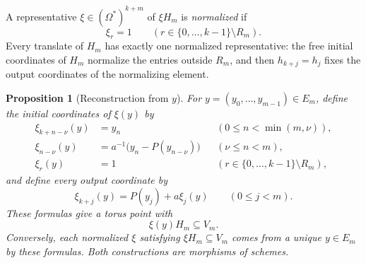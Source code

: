 \documentclass[11pt]{article}
\newcommand{\Om}{\Omega}
\newtheorem{proposition}[lemma]{Proposition}
\theoremstyle{remark}
\numberwithin{equation}{section}
\begin{document}
A representative \(\xi\in(\Om^\ast)^{k+m}\) of \(\xi H_m\) is \emph{normalized} if
\[
 \xi_r=1\qquad(r\in\{0,\ldots,k-1\}\setminus R_m).
\]
Every translate of \(H_m\) has exactly one normalized representative: the free initial coordinates of \(H_m\) normalize the entries outside \(R_m\), and then \(h_{k+j}=h_j\) fixes the output coordinates of the normalizing element.

\begin{proposition}[Reconstruction from \(y\)]\label{prop:reconstruction}
For \(y=(y_0,\ldots,y_{m-1})\in E_m\), define the initial coordinates of \(\xi(y)\) by
\begin{align}
 \xi_{k+n-\nu}(y)&=y_n
 &&(0\leq n<\min(m,\nu)), \label{eq:reconstruct-tail}\\
 \xi_{n-\nu}(y)&=a^{-1}\bigl(y_n-P(y_{n-\nu})\bigr)
 &&(\nu\leq n<m), \label{eq:reconstruct-head}\\
 \xi_r(y)&=1
 &&(r\in\{0,\ldots,k-1\}\setminus R_m), \label{eq:reconstruct-free}
\end{align}
and define every output coordinate by
\begin{equation}\label{eq:reconstruct-output}
 \xi_{k+j}(y)=P(y_j)+a\xi_j(y)\qquad(0\leq j<m).
\end{equation}
These formulas give a torus point with
\[
 \xi(y)H_m\subseteq V_m.
\]
Conversely, each normalized \(\xi\) satisfying \(\xi H_m\subseteq V_m\) comes from a unique \(y\in E_m\) by these formulas.  Both constructions are morphisms of schemes.
\end{proposition}
\end{document}
